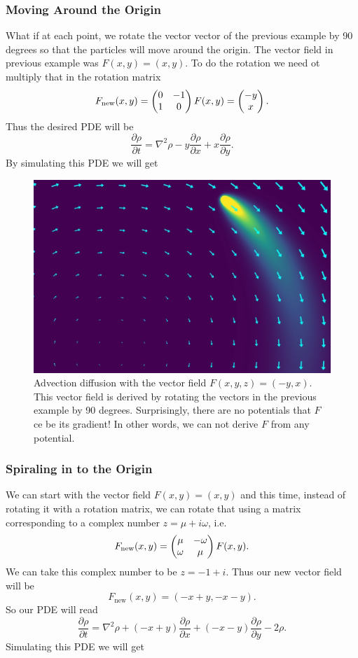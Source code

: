\subsubsection{Moving Around the Origin}
What if at each point, we rotate the vector vector of the previous example by 90 degrees so that the particles will move around the origin. The vector field in previous example was $ F(x,y) = (x,y) $. To do the rotation we need ot multiply that in the rotation matrix
\[ F_\text{new}(x,y)=  \begin{pmatrix} 0 & -1 \\ 1 & 0 \end{pmatrix}F(x,y) = \begin{pmatrix} -y \\ x \end{pmatrix}.  \]
Thus the desired PDE will be
\[ \frac{\partial \rho}{\partial t} = \nabla^2 \rho - y\frac{\partial \rho}{\partial x} + x \frac{\partial \rho}{\partial y}. \]
By simulating this PDE we will get
\begin{figure}[h!]
	\centering
	\includegraphics[width=0.7\linewidth]{images/movingAround.png}
	\caption{Advection diffusion with the vector field $ F(x,y,z) = (-y,x)$. This vector field is derived by rotating the vectors in the previous example by 90 degrees. Surprisingly, there are no potentials that $ F $ ce be its gradient! In other words, we can not derive $ F $ from any potential.}
	\label{fig:simpleadvectiondiffusion1}
\end{figure}

\FloatBarrier

\subsubsection{Spiraling in to the Origin}
We can start with the vector field $ F(x,y) = (x,y) $ and this time, instead of rotating it with a rotation matrix, we can rotate that using a matrix corresponding to a complex number $ z = \mu + i \omega $, i.e.
\[ F_\text{new}(x,y) = \begin{pmatrix} \mu & -\omega \\ \omega & \mu \end{pmatrix}F(x,y). \]
We can take this complex number to be $ z = -1 + i $. Thus our new vector field will be
\[ F_\text{new}(x,y) = (-x+y, -x-y).  \]
So our PDE will read
\[ \frac{\partial \rho}{\partial t} = \nabla^2 \rho + (-x+y)\frac{\partial \rho}{\partial x} + (-x-y)\frac{\partial \rho}{\partial y} - 2\rho. \]
Simulating this PDE we will get

